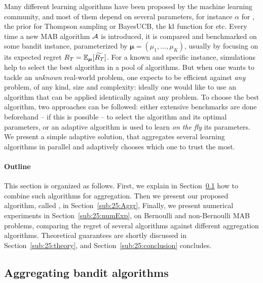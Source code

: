 Many different learning algorithms have been proposed by the machine learning community,
and most of them depend on several parameters, for instance $\alpha$ for \UCB, the prior for Thompson sampling or BayesUCB,
the $\mathrm{kl}$ function for \klUCB{} etc.
Every time a new MAB algorithm $\mathcal{A}$ is introduced, it is compared and benchmarked on some bandit instance, parameterized by $\boldsymbol{\mu} = (\mu_1,\dots,\mu_K)$, usually by focusing on its expected regret $R_T = \mathbb{E}_{\boldsymbol{\mu}}[\widetilde{R_T}]$.
%
For a known and specific instance, simulations help to select the best algorithm in a pool of algorithms.
But when one wants to tackle an \emph{unknown} real-world problem, one expects to be efficient against \emph{any} problem, of any kind, size and complexity:
ideally one would like to use an algorithm that can be applied identically against any problem.
To choose the best algorithm, two approaches can be followed:
either extensive benchmarks are done beforehand -- if this is possible -- to select the algorithm and its optimal parameters, or an adaptive algorithm is used to learn \emph{on the fly} its parameters.
We present a simple adaptive solution, that aggregates several learning algorithms in parallel and adaptively chooses which one to trust the most.


\paragraph{Outline}
This section is organized as follows.
First, we explain in Section~\ref{sub:25:aggregation} how to combine such algorithms for aggregation.
Then we present our proposed algorithm, called \Aggr, in Section~\ref{sub:25:Aggr},
Finally, we present numerical experiments in Section~\ref{sub:25:numExp},
on Bernoulli and non-Bernoulli MAB problems,
comparing the regret of several algorithms against different aggregation algorithms.
Theoretical guarantees are shortly discussed in Section~\ref{sub:25:theory}, and Section~\ref{sub:25:conclusion} concludes.


\subsection{Aggregating bandit algorithms}\label{sub:25:aggregation}

